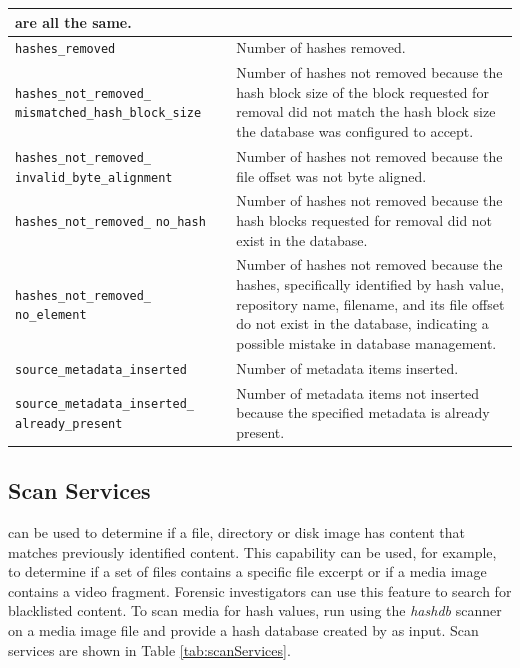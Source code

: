 \documentclass[11pt,fleqn]{article} %
\begin{document}
\begin{table}[!ht]
\begin{tabular}{|p{5 cm}|p{8.8 cm}|}
are all the same.\\
\hline
\verb+hashes_removed+ & Number of hashes removed.\\
\hline
\verb+hashes_not_removed_+ \verb+mismatched_hash_block_size+ & Number of hashes not removed because the hash block size of the block requested for removal did not match the hash block size the database was configured to accept.
\\
\hline
\verb+hashes_not_removed_+ \verb+invalid_byte_alignment+ &  Number of hashes not removed because the file offset was not byte aligned.\\
\hline
\verb+hashes_not_removed_+ \verb+no_hash+ &  Number of hashes not removed because the hash blocks requested for removal did not exist in the database.\\
\hline
\verb+hashes_not_removed_+ \verb+no_element+ &  Number of hashes not removed because the hashes, specifically identified by 
hash value, repository name, filename, and its file offset do not exist in the database, indicating a possible mistake in database management.\\
\hline
\verb+source_metadata_inserted+ & Number of metadata items inserted.\\
\hline
\verb+source_metadata_inserted_+ \verb+already_present+ & Number of metadata items not inserted because the specified metadata is already present.\\
\hline
\end{tabular}
\end{table}

\subsection{Scan Services}
\label{ScanServices}
\hash can be used to determine if a file, directory or disk image has content that matches previously identified content. This capability can be used, for example, to determine if a set of files contains a specific file excerpt or if a media image contains a video fragment. Forensic investigators can use this feature to search for blacklisted content. To scan media for hash values, run using the \bulk \textit{hashdb} scanner on a media image file and provide a hash database created by \hash as input.
Scan services are shown in Table \ref{tab:scanServices}. \\
\end{document}
